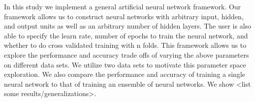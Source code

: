 In this study we implement a general artificial neural network framework.
Our framework allows us to construct neural networks with arbitrary input, hidden, and output units as well as an arbitrary number of hidden layers.
The user is also able to specify the learn rate, number of epochs to train the neural network, and whether to do cross validated training with n folds.
This framework allows us to explore the performance and accuracy trade offs of varying the above parameters on different data sets.
We utilize two data sets to motivate this parameter space exploration.
We also compare the performance and accuracy of training a single neural network to that of training an ensemble of neural networks.
We show <list some results/generalizations>.
